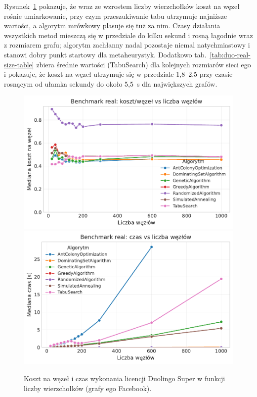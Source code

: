Rysunek~\ref{fig:duo-real-size} pokazuje, że wraz ze wzrostem liczby wierzchołków koszt na węzeł rośnie umiarkowanie, przy czym przeszukiwanie tabu utrzymuje najniższe wartości, a algorytm mrówkowy plasuje się tuż za nim. Czasy działania wszystkich metod mieszczą się w przedziale do kilku sekund i rosną łagodnie wraz z rozmiarem grafu; algorytm zachłanny nadal pozostaje niemal natychmiastowy i stanowi dobry punkt startowy dla metaheurystyk. Dodatkowo tab.~\ref{tab:duo-real-size-table} zbiera średnie wartości (TabuSearch) dla kolejnych rozmiarów sieci ego i pokazuje, że koszt na węzeł utrzymuje się w przedziale 1{,}8--2{,}5 przy czasie rosnącym od ułamka sekundy do około 5{,}5~s dla największych grafów.

\begin{figure}[H]
  \centering
  \includegraphics[width=0.48\linewidth]{assets/figures/benchmark/real/cost_per_node_vs_nodes.pdf}
  \hfill
  \includegraphics[width=0.48\linewidth]{assets/figures/benchmark/real/time_vs_nodes.pdf}
  \caption{Koszt na węzeł i czas wykonania licencji Duolingo Super w funkcji liczby wierzchołków (grafy ego Facebook).}
  \label{fig:duo-real-size}
\end{figure}

